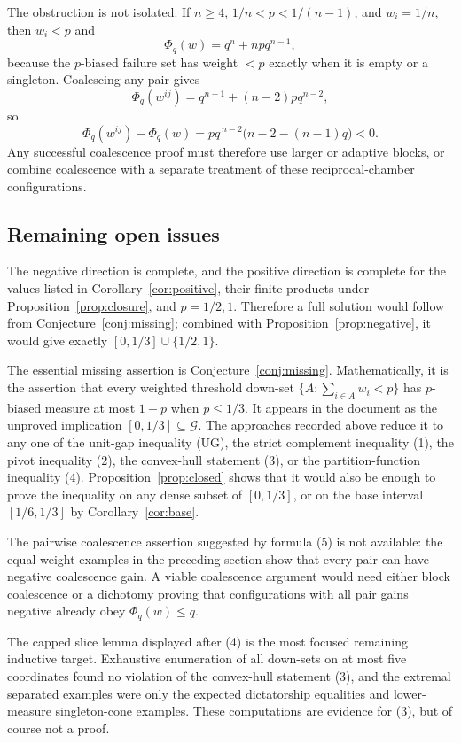 \documentclass[12pt]{article}
\begin{document}
The obstruction is not isolated.  If \(n\ge4\),
\(1/n<p<1/(n-1)\), and \(w_i=1/n\), then \(w_i<p\) and
\[
 \Phi_q(w)=q^n+npq^{n-1},
\]
because the \(p\)-biased failure set has weight \(<p\) exactly when it is empty
or a singleton.  Coalescing any pair gives
\[
 \Phi_q(w^{ij})=q^{n-1}+(n-2)pq^{n-2},
\]
so
\[
 \Phi_q(w^{ij})-\Phi_q(w)
   =p q^{\,n-2}\bigl(n-2-(n-1)q\bigr)<0 .
\]
Any successful coalescence proof must therefore use larger or adaptive blocks,
or combine coalescence with a separate treatment of these reciprocal-chamber
configurations.
\subsection*{Remaining open issues}

The negative direction is complete, and the positive direction is complete for
the values listed in Corollary~\ref{cor:positive}, their finite products under
Proposition~\ref{prop:closure}, and \(p=1/2,1\).  Therefore a full solution
would follow from Conjecture~\ref{conj:missing}; combined with
Proposition~\ref{prop:negative}, it would give exactly
\([0,1/3]\cup\{1/2,1\}\).

The essential missing assertion is Conjecture~\ref{conj:missing}.  Mathematically, it
is the assertion that every weighted threshold down-set
\(\{A:\sum_{i\in A}w_i<p\}\) has \(p\)-biased measure at most \(1-p\) when
\(p\le1/3\).  It appears in the document as the unproved implication
\([0,1/3]\subseteq\mathcal G\).  The approaches recorded above reduce it to
any one of the unit-gap inequality (UG), the strict complement inequality (1),
the pivot inequality (2), the convex-hull statement (3), or the
partition-function inequality (4).  Proposition~\ref{prop:closed} shows that it
would also be enough to prove the inequality on any dense subset of
\([0,1/3]\), or on the base interval \([1/6,1/3]\) by
Corollary~\ref{cor:base}.

The pairwise coalescence assertion suggested by formula (5) is not available:
the equal-weight examples in the preceding section show that every pair can have
negative coalescence gain.  A viable coalescence argument would need either block
coalescence or a dichotomy proving that configurations with all pair gains
negative already obey \(\Phi_q(w)\le q\).

The capped slice lemma displayed after (4) is the most focused remaining
inductive target.  Exhaustive enumeration of all down-sets on at most five
coordinates found no violation of the convex-hull statement (3), and the
extremal separated examples were only the expected dictatorship equalities and
lower-measure singleton-cone examples.  These computations are evidence for
(3), but of course not a proof.
\end{document}

